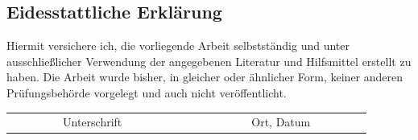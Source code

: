 \documentclass[a4paper,11pt,singlespacing]{article}
\begin{document}
%
\begin{newpage}
\vspace*{\fill}
\section*{Eidesstattliche Erklärung}\label{sec:Eidesstattliche Erklärung}
	Hiermit versichere ich, die vorliegende Arbeit selbstständig und unter ausschließlicher Verwendung der angegebenen Literatur und Hilfsmittel erstellt zu haben. Die Arbeit wurde bisher, in gleicher oder ähnlicher Form, keiner anderen Prüfungsbehörde vorgelegt und auch nicht veröffentlicht.\\

\vspace{3cm}
\begin{tabular*}{\textwidth}{c@{\extracolsep\fill}cc}
\cline{1-1}
\cline{3-3}
\\
\ \ \ \ \ \ \ \ \ Unterschrift\ \ \ \ \ \ \ \ \ \ & & \ \ \ \ \ \ \ \ \ Ort, Datum\ \ \ \ \ \ \ \ \ \\
\end{tabular*}
\end{newpage}
\end{document}
